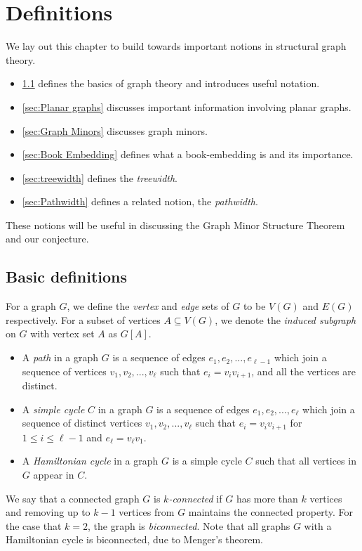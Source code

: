 \chapter{Definitions}\label{chap:Definitions}
We lay out this chapter to build towards important notions in structural graph theory.
\begin{itemize}
	\item \cref{sec: Basic definitions} defines the basics of graph theory and introduces useful notation.
	\item \cref{sec:Planar graphs} discusses important information involving planar graphs. 
	\item \cref{sec:Graph Minors} discusses graph minors.
	\item \cref{sec:Book Embedding} defines what a book-embedding is and its importance. 
	\item \cref{sec:treewidth} defines the \textit{treewidth}.
	\item \cref{sec:Pathwidth} defines a related notion, the \textit{pathwidth}.
\end{itemize}
These notions will be useful in discussing the Graph Minor Structure Theorem and our conjecture. 
\section{Basic definitions}\label{sec: Basic definitions}
For a graph $G$, we define the \textit{vertex} and \textit{edge} sets of $G$ to be $V(G)$ and $E(G)$ respectively.
For a subset of vertices $A \subseteq V(G)$, we denote the \textit{induced subgraph} on $G$ with vertex set $A$ as $G[A]$. 

\begin{itemize}
	\item A \textit{path} in a graph $G$ is a sequence of edges $e_1, e_2, ..., e_{\ell- 1}$ which join a sequence of vertices $v_1, v_2, ..., v_{\ell}$ such that $e_i = v_iv_{i + 1}$, and all the vertices are distinct. 
	\item A \textit{simple cycle} $C$ in a graph $G$ is a sequence of edges $e_1, e_2, ..., e_{\ell}$ which join a sequence of distinct vertices $v_1, v_2, ..., v_{\ell}$ such that $e_i = v_iv_{i + 1}$ for $1 \leq i \leq \ell - 1$ and $e_\ell = v_\ell v_1$. 
	\item A \textit{Hamiltonian cycle} in a graph $G$ is a simple cycle $C$ such that all vertices in $G$ appear in $C$.
\end{itemize}

We say that a connected graph $G$ is \textit{$k$-connected} if $G$ has more than $k$ vertices and removing up to $k-1$ vertices from $G$ maintains the connected property. For the case that $k = 2$, the graph is \textit{biconnected}. Note that all graphs $G$ with a Hamiltonian cycle is biconnected, due to Menger's theorem.\cite{}

